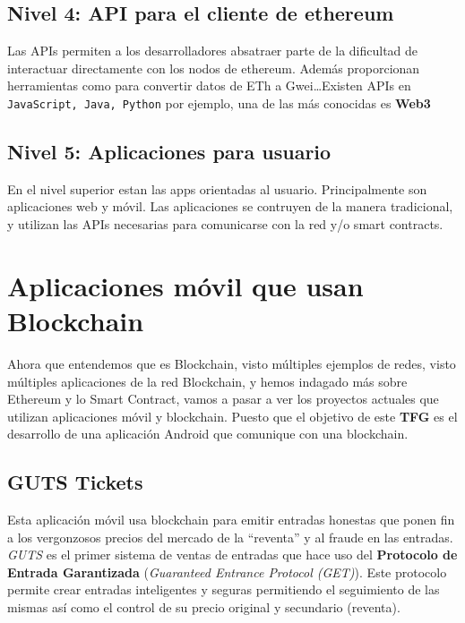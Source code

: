 \subsection{Nivel 4: API para el cliente de ethereum}

Las APIs permiten a los desarrolladores absatraer parte de la dificultad de interactuar directamente con los nodos de ethereum. Además proporcionan herramientas como para convertir datos de ETh a Gwei\dots Existen APIs en \verb|JavaScript, Java, Python| por ejemplo, una de las más conocidas es \textbf{Web3}\cite{web3}

\subsection{Nivel 5: Aplicaciones para usuario}

En el nivel superior estan las apps orientadas al usuario. Principalmente son aplicaciones web y móvil. Las aplicaciones se contruyen de la manera tradicional, y utilizan las APIs necesarias para comunicarse con la red y/o smart contracts.

\section{Aplicaciones móvil que usan Blockchain}

Ahora que entendemos que es Blockchain, visto múltiples ejemplos de redes, visto múltiples aplicaciones de la red Blockchain, y hemos indagado más sobre Ethereum y lo Smart Contract, vamos a pasar a ver los proyectos actuales que utilizan aplicaciones móvil y blockchain. Puesto que el objetivo de este \textbf{TFG} es el desarrollo de una aplicación Android que comunique con una blockchain. 

\subsection{GUTS Tickets}

Esta aplicación móvil usa blockchain para emitir entradas honestas que ponen fin a los vergonzosos precios del mercado de la ``reventa'' y al fraude en las entradas. \emph{GUTS} es el primer sistema de ventas de entradas que hace uso del \textbf{Protocolo de Entrada Garantizada} {\small (\emph{Guaranteed Entrance Protocol (GET)})}\cite{GET}. Este protocolo permite crear entradas inteligentes y seguras permitiendo el seguimiento de las mismas así como el control de su precio original y secundario (reventa). 

